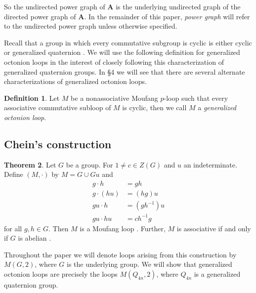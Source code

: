 \documentclass[12pt]{report}
\theoremstyle{definition}
\newtheorem{thm}{Theorem}[chapter]
\newtheorem{dfn}[thm]{Definition}
\begin{document}
So the undirected power graph of \textbf{A} is the underlying undirected graph of the directed power graph of
  \textbf{A}. In the remainder of this paper, \textit{power graph} will refer to the undirected power graph
  unless otherwise specified.

Recall that a group in which every commutative subgroup is cyclic is either cyclic or generalized quaternion
  \cite{Cartan}. We will use the following definition for generalized octonion loops in the interest of closely
  following this characterization of generalized quaternion groups. In {\S}4 we will see that there are several
  alternate characterizations of generalized octonion loops.

\begin{dfn}
	Let $M$ be a nonassociative Moufang $p$-loop such that every associative commutative subloop of $M$ is cyclic,
    then we call $M$ a \textit{generalized octonion loop}.
\end{dfn}

\subsection{Chein's construction}

\begin{thm}\label{cnst-chein}
  Let $G$ be a group. For $1\neq c\in Z(G)$ and $u$ an indeterminate. Define $(M, \cdot)$ by $M = G\cup Gu$ and
  \begin{align*}
    g\cdot h &= gh\\
    g\cdot (hu) &= (hg)u\\
    gu\cdot h &= (gh^{-1})u\\
    gu\cdot hu &= ch^{-1}g
  \end{align*}
  for all $g, h\in G$. Then $M$ is a Moufang loop \cite{Chein}. Further, $M$ is associative if and only if $G$
    is abelian \cite{Chein}.
\end{thm}

Throughout the paper we will denote loops arising from this construction by $M(G, 2)$, where $G$ is the underlying
  group. We will show that generalized octonion loops are precisely the loops $M(Q_{4n}, 2)$, where $Q_{4n}$ is
  a generalized quaternion group.
\end{document}
